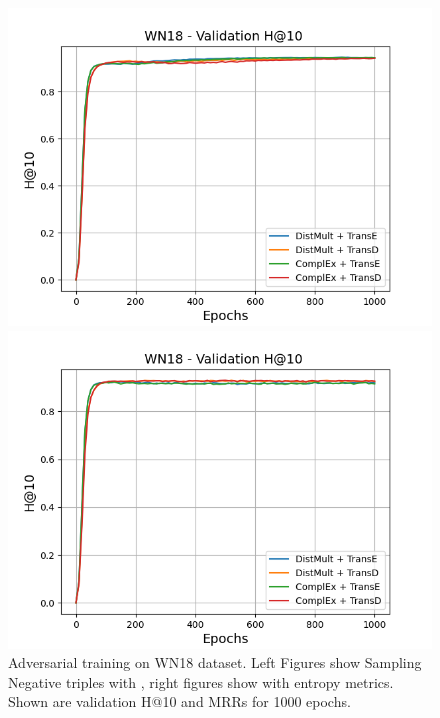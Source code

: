 \begin{figure}[H]
\begin{minipage}{.45\textwidth}
      \includegraphics[width=0.9\linewidth]{figures/results/gan_train/not_pretrained/random/wn18/epochs1000/random_wn18_hit10.png}
    \end{minipage}%
    \begin{minipage}{.45\textwidth}
      \centering
      \includegraphics[width=0.9\linewidth]{figures/results/gan_train/not_pretrained/uncertainty/max_distribution/entropy/wn18/1k_epochs/uncertainty_wn18_hit10.png}
    \end{minipage}%
    \caption{Adversarial training on \textsc{WN18} dataset. 
    Left Figures show Sampling Negative triples with \origsampling, right figures show \ussoftmax with entropy metrics.
    Shown are validation H@10 and MRRs for 1000 epochs.}
    \label{fig:advtrain_wn18_random_vs_uncertainty}
\end{figure}

